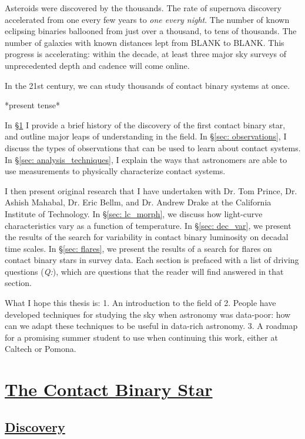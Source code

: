 \documentclass[12pt]{article} %
\numberwithin{equation}{section} %
\begin{document}
Asteroids were discovered by the thousands. The rate of supernova discovery accelerated from one every few years to \emph{one every night}.  The number of known eclipsing binaries ballooned from just over a thousand, to tens of thousands. The number of galaxies with known distances lept from BLANK to BLANK. This progress is accelerating: within the decade, at least three major sky surveys of unprecedented depth and cadence will come online.

In the 21st century, we can study thousands of contact binary systems at once. 

*present tense*

In \S \ref{sec: background} I provide a brief history of the discovery of the first contact binary star, and outline major leaps of understanding in the field. In \S \ref{sec: observations}, I discuss the types of observations that can be used to learn about contact systems. In \S \ref{sec: analysis_techniques}, I explain the ways that astronomers are able to use measurements to physically characterize contact systems.

I then present original research that I have undertaken with Dr. Tom Prince, Dr. Ashish Mahabal, Dr. Eric Bellm, and Dr. Andrew Drake at the California Institute of Technology. In \S \ref{sec: lc_morph}, we discuss how light-curve characteristics vary as a function of temperature. In \S \ref{sec: dec_var}, we present the results of the search for variability in contact binary luminosity on decadal time scales. In \S \ref{sec: flares}, we present the results of a search for flares on contact binary stars in survey data. Each section is prefaced with a list of driving questions (\emph{Q:}), which are questions that the reader will find answered in that section.

What I hope this thesis is:
1. An introduction to the field of 
2. People have developed techniques for studying the sky when astronomy was data-poor: how can we adapt these techniques to be useful in data-rich astronomy.
3. A roadmap for a promising summer student to use when continuing this work, either at Caltech or Pomona.

\section[The Contact Binary Star]{\hyperlink{toc}{The Contact Binary Star}} \label{sec: background}

\subsection[\emph{Discovery}]{\hyperlink{toc}{Discovery}}
\end{document}
